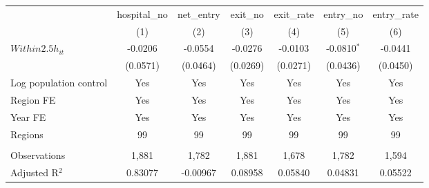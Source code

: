 \begingroup
\centering
\begin{tabular}{lcccccc}
   \toprule
                          & hospital\_no  & net\_entry  & exit\_no  & exit\_rate  & entry\_no     & entry\_rate \\    
                          & (1)           & (2)         & (3)       & (4)         & (5)           & (6)\\  
   \midrule 
   $Within2.5h_{it}$      & -0.0206       & -0.0554     & -0.0276   & -0.0103     & -0.0810$^{*}$ & -0.0441\\   
                          & (0.0571)      & (0.0464)    & (0.0269)  & (0.0271)    & (0.0436)      & (0.0450)\\   
   Log population control & Yes           & Yes         & Yes       & Yes         & Yes           & Yes\\  
   Region FE              & Yes           & Yes         & Yes       & Yes         & Yes           & Yes\\  
   Year FE                & Yes           & Yes         & Yes       & Yes         & Yes           & Yes\\  
   Regions                & 99            & 99          & 99        & 99          & 99            & 99\\  
    \\
   Observations           & 1,881         & 1,782       & 1,881     & 1,678       & 1,782         & 1,594\\  
   Adjusted R$^2$         & 0.83077       & -0.00967    & 0.08958   & 0.05840     & 0.04831       & 0.05522\\  
   \bottomrule
\end{tabular}
\par\endgroup
